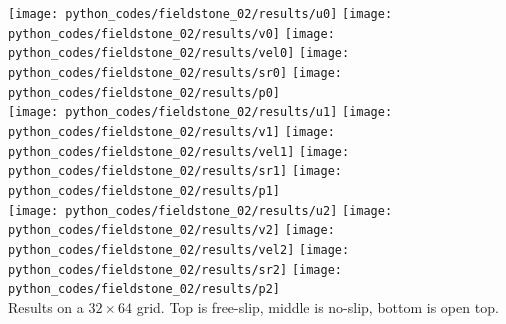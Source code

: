 \begin{center}
\texttt{[image: python\_codes/fieldstone\_02/results/u0]}
\texttt{[image: python\_codes/fieldstone\_02/results/v0]}
\texttt{[image: python\_codes/fieldstone\_02/results/vel0]}
\texttt{[image: python\_codes/fieldstone\_02/results/sr0]}
\texttt{[image: python\_codes/fieldstone\_02/results/p0]}\\
\texttt{[image: python\_codes/fieldstone\_02/results/u1]}
\texttt{[image: python\_codes/fieldstone\_02/results/v1]}
\texttt{[image: python\_codes/fieldstone\_02/results/vel1]}
\texttt{[image: python\_codes/fieldstone\_02/results/sr1]}
\texttt{[image: python\_codes/fieldstone\_02/results/p1]}\\
\texttt{[image: python\_codes/fieldstone\_02/results/u2]}
\texttt{[image: python\_codes/fieldstone\_02/results/v2]}
\texttt{[image: python\_codes/fieldstone\_02/results/vel2]}
\texttt{[image: python\_codes/fieldstone\_02/results/sr2]}
\texttt{[image: python\_codes/fieldstone\_02/results/p2]}\\
{\captionfont Results on a $32\times 64$ grid. Top is free-slip, 
middle is no-slip, bottom is open top.}
\end{center}


